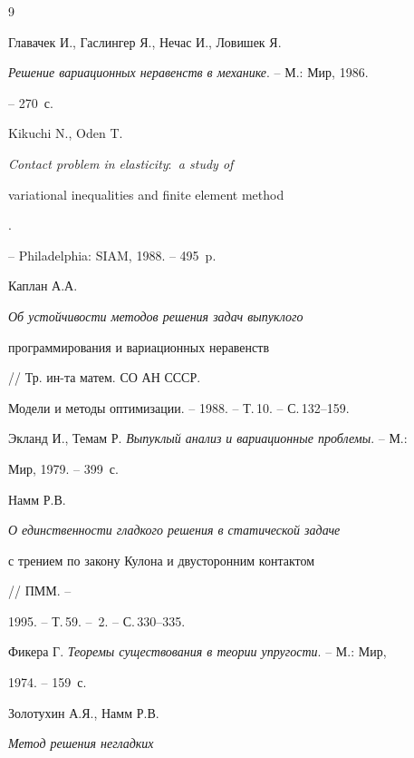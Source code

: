 \begin{thebibliography}{9}







Главачек И., Гаслингер Я., Нечас И., Ловишек Я.


{\em Решение вариационных неравенств в механике}. -- М.: Мир, 1986.


-- 270~с.







Kikuchi N., Oden T. {\em Contact problem in elasticity$:$ a study of


variational inequalities and finite element method}.


-- Philadelphia: SIAM, 1988. -- 495~p.







Каплан А.А. {\em Об устойчивости методов решения задач выпуклого


программирования и вариационных неравенств} // Тр. ин-та матем. СО АН СССР. 


Модели и методы оптимизации. -- 1988. -- Т.\,10. -- С.\,132--159.







Экланд И., Темам Р. {\em Выпуклый анализ и вариационные проблемы}. -- М.:


Мир, 1979. -- 399~с.







Намм Р.В. {\em О единственности гладкого решения в статической задаче


с трением по закону Кулона и двусторонним контактом} // ПММ. --


1995. -- Т.\,59. -- \No\,2. -- С.\,330--335.







Фикера Г. {\em Теоремы существования в теории упругости}. -- М.: Мир,


1974. -- 159~с.







Золотухин А.Я., Намм Р.В. {\em Метод решения негладких


}
\end{thebibliography}
